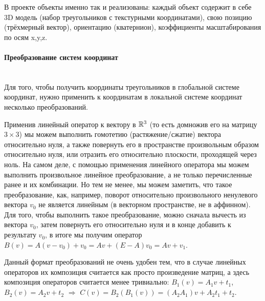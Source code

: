 \documentclass{article}
\begin{document}
В проекте объекты именно так и реализованы: каждый объект содержит в себе 3D модель (набор треугольников с текстурными координатами), свою позицию (трёхмерный вектор), ориентацию (кватернион), коэффициенты масштабирования по осям x,y,z.

\paragraph{Преобразование систем координат}
$\text{}$\\
Для того, чтобы получить координаты треугольников в глобальной системе координат, нужно применить к координатам в локальной системе координат несколько преобразований.

Применив линейный оператор к вектору в $\mathbb{R}^3$ (то есть домножив его на матрицу $3\times 3$) мы можем выполнить гомотетию (растяжение/сжатие) вектора относительно нуля, а также повернуть его в пространстве произвольным образом относительно нуля, или отразить его относительно плоскости, проходящей через ноль. На самом деле, с помощью применения линейного оператора мы можем выполнить произвольное линейное преобразование, а не только перечисленные ранее и их комбинации. Но тем не менее, мы можем заметить, что такое преобразование, как, например, поворот относительно произвольного ненулевого вектора $v_0$ не является линейным (в векторном пространстве, не в аффинном). Для того, чтобы выполнить такое преобразование, можно сначала вычесть из вектора $v_0$, затем повернуть его относительно нуля и в конце добавить к результату $v_0$, в итоге мы получим оператор $B(v) = A(v-v_0)+v_0=Av+(E-A)v_0=Av+v_1$.

Данный формат преобразований не очень удобен тем, что в случае линейных операторов их композиция считается как просто произведение матриц, а здесь композиция операторов считается менее тривиально: $B_1(v)=A_1v+t_1$, $B_2(v)=A_2v + t_2$ $\Rightarrow$ $C(v) = B_2(B_1(v))=(A_2A_1)v + A_2t_1 + t_2$.
\end{document}
